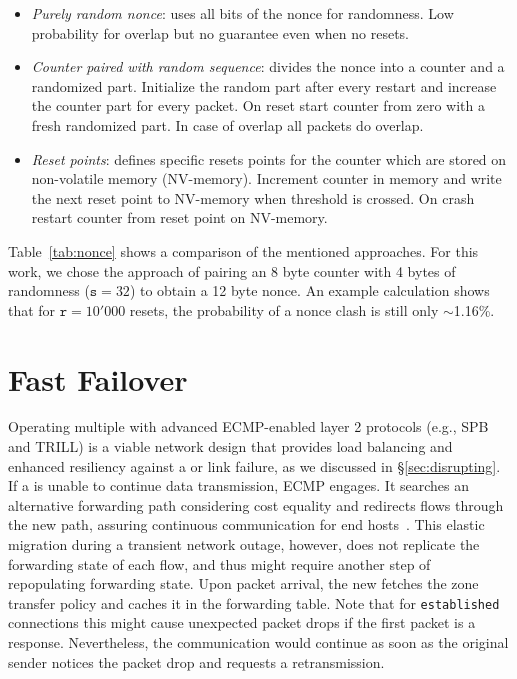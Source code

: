 \begin{itemize}
	\item \textit{Purely random nonce}: uses all bits of the nonce for randomness. Low
	      probability for overlap but no guarantee even when no resets.
	\item \textit{Counter paired with random sequence}: divides the nonce into a counter
	      and a randomized part. Initialize the random part after every restart and increase
	      the counter part for every packet. On reset start counter from zero with a fresh
	      randomized part. In case of overlap all packets do overlap.
	\item \textit{Reset points}: defines specific resets points for the counter which are
	      stored on non-volatile memory (NV-memory). Increment counter in memory and write the
	      next reset point to NV-memory when threshold is crossed. On crash restart counter from
	      reset point on NV-memory.
\end{itemize}

Table~\ref{tab:nonce} shows a comparison of the mentioned approaches. For this work, we chose the
approach of pairing an 8 byte counter with 4 bytes of randomness ($\texttt{s} = 32$) to obtain a 12
byte nonce. An example calculation shows that for $\texttt{r} = 10'000$ resets, the probability of
a nonce clash is still only $\sim$1.16\%.



\section{Fast Failover}
\label{sec:ecmp}
Operating multiple \tps with advanced ECMP-enabled layer 2 protocols (e.g., SPB and
TRILL) is a viable network design that provides load balancing and enhanced resiliency
against a \tp or link failure, as we discussed in \S\ref{sec:disrupting}.
If a \tp is unable to continue data transmission, ECMP engages. It searches an alternative
forwarding path considering cost equality and redirects flows through the new path, assuring
continuous communication for end hosts~\cite{rfc6754}.
This elastic migration during a transient network outage, however, does not replicate the
forwarding state of each flow, and thus might require another step of repopulating
forwarding state. Upon packet arrival, the new \tp fetches the zone transfer policy
and caches it in the forwarding table. Note that for \texttt{established} connections this might
cause unexpected packet drops if the first packet is a response. Nevertheless, the
communication would continue as soon as the original sender notices the packet drop
and requests a retransmission.

